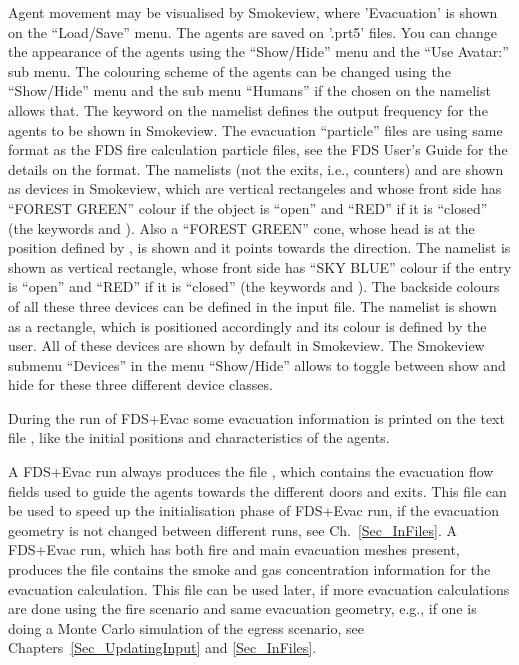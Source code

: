 \documentclass[12pt,a4paper,final,twoside]{stylevk}
\begin{document}
Agent movement may be visualised by Smokeview, where 'Evacuation' is
shown on the ``Load/Save'' menu.  The agents are saved on '.prt5'
files.  You can change the appearance of the agents using the
``Show/Hide'' menu and the ``Use Avatar:'' sub menu.  The colouring
scheme of the agents can be changed using the ``Show/Hide'' menu and
the sub menu ``Humans'' if the chosen  on the
 namelist allows that.  The  keyword on
the  namelist defines the output frequency for the agents
to be shown in Smokeview.  The evacuation ``particle'' files are using
same format as the FDS fire calculation particle files, see the FDS
User's Guide for the details on the format.  The namelists
 (not the  exits, i.e.,
counters) and  are shown as devices in Smokeview, which
are vertical rectangeles and whose front side has ``FOREST GREEN''
colour if the object is ``open'' and ``RED'' if it is ``closed'' (the
keywords  and ).  Also a ``FOREST
GREEN'' cone, whose head is at the position defined by , is
shown and it points towards the  direction.  The namelist
 is shown as vertical rectangle, whose front side has
``SKY BLUE'' colour if the entry is ``open'' and ``RED'' if it is
``closed'' (the keywords  and ).
The backside colours of all these three devices can be defined in the
input file.  The  namelist is shown as a rectangle, which
is positioned accordingly and its colour is defined by the user.  All
of these devices are shown by default in Smokeview.  The Smokeview
submenu ``Devices'' in the menu ``Show/Hide'' allows to toggle between
show and hide for these three different device classes.


During the run of FDS+Evac some evacuation information is printed on
the text file , like the initial positions and
characteristics of the agents.


A FDS+Evac run always produces the file , which
contains the evacuation flow fields used to guide the agents towards
the different doors and exits.  This file can be used to speed up the
initialisation phase of FDS+Evac run, if the evacuation geometry is
not changed between different runs, see Ch.~\ref{Sec_InFiles}.  A
FDS+Evac run, which has both fire and main evacuation meshes present,
produces the file  contains the smoke and gas
concentration information for the evacuation calculation.  This file
can be used later, if more evacuation calculations are done using the
fire scenario and same evacuation geometry, e.g., if one is
doing a Monte Carlo simulation of the egress scenario, see
Chapters~\ref{Sec_UpdatingInput} and \ref{Sec_InFiles}.
\end{document}
